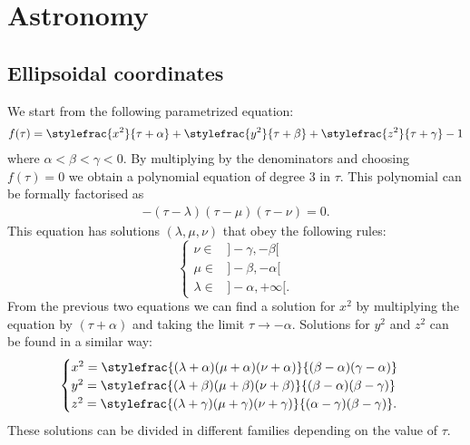 \chapter{Astronomy}

\section{Ellipsoidal coordinates}

    We start from the following parametrized equation:
    \begin{gather}\index{coordinates!ellipsoidal}
        \label{astronomy:ellipsoidal_defining_function}
        f(\tau) = \stylefrac{x^2}{\tau + \alpha} + \stylefrac{y^2}{\tau + \beta} + \stylefrac{z^2}{\tau + \gamma} - 1
    \end{gather}
    where $\alpha<\beta<\gamma<0$. By multiplying by the denominators and choosing $f(\tau) = 0$ we obtain a polynomial equation of degree 3 in $\tau$. This polynomial can be formally factorised as
    \begin{gather}
        -(\tau-\lambda)(\tau-\mu)(\tau-\nu) = 0.
    \end{gather}
    This equation has solutions $(\lambda, \mu, \nu)$ that obey the following rules:
    \[
        \begin{cases}
            \nu\in&]-\gamma, -\beta[\\
            \mu\in&]-\beta, -\alpha[\\
            \lambda\in&]-\alpha, +\infty[.
        \end{cases}
    \]
    From the previous two equations we can find a solution for $x^2$ by multiplying the equation by $(\tau+\alpha)$ and taking the limit $\tau\rightarrow-\alpha$. Solutions for $y^2$ and $z^2$ can be found in a similar way:
    \begin{gather}
        \label{astronomy:ellipsoidal_coordinates}
        \begin{cases}
            x^2 = \stylefrac{(\lambda + \alpha)(\mu + \alpha)(\nu + \alpha)}{(\beta - \alpha)(\gamma - \alpha)}&\\
            y^2 = \stylefrac{(\lambda + \beta)(\mu + \beta)(\nu + \beta)}{(\beta - \alpha)(\beta - \gamma)}&\\
            z^2 = \stylefrac{(\lambda + \gamma)(\mu + \gamma)(\nu + \gamma)}{(\alpha - \gamma)(\beta - \gamma)}.&
        \end{cases}
    \end{gather}
    These solutions can be divided in different families depending on the value of $\tau$.


